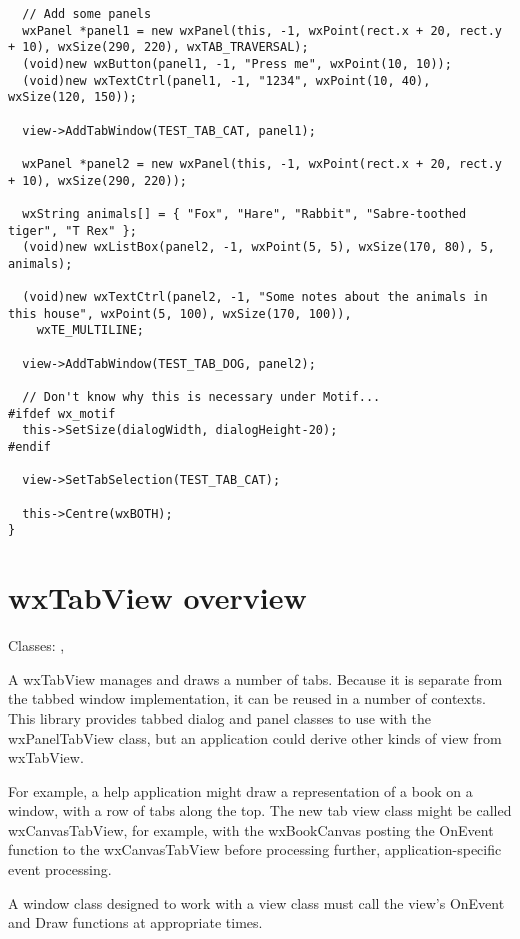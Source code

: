 {\begin{verbatim}
  // Add some panels
  wxPanel *panel1 = new wxPanel(this, -1, wxPoint(rect.x + 20, rect.y + 10), wxSize(290, 220), wxTAB_TRAVERSAL);
  (void)new wxButton(panel1, -1, "Press me", wxPoint(10, 10));
  (void)new wxTextCtrl(panel1, -1, "1234", wxPoint(10, 40), wxSize(120, 150));
  
  view->AddTabWindow(TEST_TAB_CAT, panel1);

  wxPanel *panel2 = new wxPanel(this, -1, wxPoint(rect.x + 20, rect.y + 10), wxSize(290, 220));

  wxString animals[] = { "Fox", "Hare", "Rabbit", "Sabre-toothed tiger", "T Rex" };
  (void)new wxListBox(panel2, -1, wxPoint(5, 5), wxSize(170, 80), 5, animals);

  (void)new wxTextCtrl(panel2, -1, "Some notes about the animals in this house", wxPoint(5, 100), wxSize(170, 100)),
    wxTE_MULTILINE;
  
  view->AddTabWindow(TEST_TAB_DOG, panel2);
  
  // Don't know why this is necessary under Motif...
#ifdef wx_motif
  this->SetSize(dialogWidth, dialogHeight-20);
#endif

  view->SetTabSelection(TEST_TAB_CAT);
  
  this->Centre(wxBOTH);
}
\end{verbatim}
}

\section{wxTabView overview}\label{wxtabviewoverview}

Classes: , 

A wxTabView manages and draws a number of tabs. Because it is separate
from the tabbed window implementation, it can be reused in a number of contexts.
This library provides tabbed dialog and panel classes to use with the
wxPanelTabView class, but an application could derive other kinds of
view from wxTabView. 

For example, a help application might draw a representation of a book on
a window, with a row of tabs along the top. The new tab view class might
be called wxCanvasTabView, for example, with the wxBookCanvas posting
the OnEvent function to the wxCanvasTabView before processing further,
application-specific event processing. 

A window class designed to work with a view class must call the view's
OnEvent and Draw functions at appropriate times.

